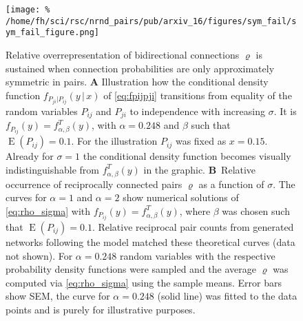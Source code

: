 \begin{figure}[h!]
\centering
\texttt{[image: \%
  /home/fh/sci/rsc/nrnd\_pairs/pub/arxiv\_16/figures/sym\_fail/sym\_fail\_figure.png]}
\caption{Relative overrepresentation of bidirectional connections $\varrho$ is sustained when connection probabilities are only approximately symmetric in pairs. \textbf{A} Illustration how the conditional density function $f_{P_{ji} | P_{ij}} (y\,\vert\, x)$ of \eqref{eq:fpijpji} transitions from equality of the random variables $P_{ij}$ and $P_{ji}$ to independence with increasing $\sigma$. It is $f_{P_{ij}} (y) = f^T_{\alpha,\beta}(y)$, with $\alpha=0.248$ and $\beta$ such that $\operatorname{E}(P_{ij})=0.1$. For the illustration $P_{ij}$ was fixed as $x=0.15$. Already for $\sigma=1$ the conditional density function becomes visually indistinguishable from  $f^T_{\alpha,\beta}(y)$ in the graphic. \textbf{B}~Relative occurrence of reciprocally connected pairs $\varrho$ as a function of $\sigma$. The curves for $\alpha=1$ and $\alpha=2$ show numerical solutions of \eqref{eq:rho_sigma} with $f_{P_{ij}}(y) = f_{\alpha,\beta}^T(y)$, where $\beta$ was chosen such that $\operatorname{E}(P_{ij}) = 0.1$. Relative reciprocal pair counts from generated networks following the model matched these theoretical curves (data not shown). For $\alpha = 0.248$ random variables with the respective probability density functions were sampled and the average $\varrho$ was computed via \eqref{eq:rho_sigma} using the sample means. Error bars show SEM, the curve for $\alpha = 0.248$ (solid line)  was fitted to the data points and is purely for illustrative purposes.} 
\label{fig:sym_fail}
\end{figure}


%

